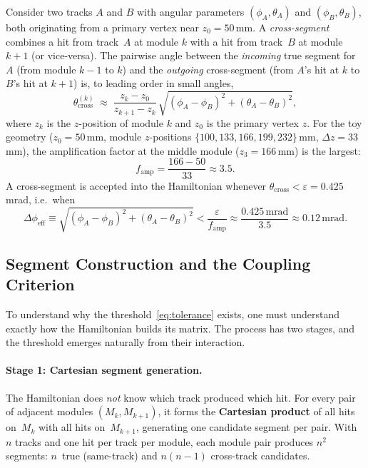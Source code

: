 \documentclass[12pt,a4paper]{article}
\newcommand{\eps}{\varepsilon}
\begin{document}
Consider two tracks $A$ and $B$ with angular parameters
$(\phi_A,\theta_A)$ and $(\phi_B,\theta_B)$, both originating from a
primary vertex near $z_0 = 50$\,mm.
A \emph{cross-segment} combines a hit from track~$A$ at module $k$ with a hit
from track~$B$ at module $k\!+\!1$ (or vice-versa).
The pairwise angle between the \emph{incoming} true segment for~$A$
(from module $k\!-\!1$ to $k$) and the \emph{outgoing} cross-segment
(from $A$'s hit at $k$ to $B$'s hit at $k\!+\!1$) is, to leading order in
small angles,
\begin{equation}
  \theta_\text{cross}^{(k)} \;\approx\;
  \frac{z_k - z_0}{z_{k+1} - z_k}\,
  \sqrt{(\phi_A - \phi_B)^2 + (\theta_A - \theta_B)^2},
  \label{eq:cross_angle}
\end{equation}
where $z_k$ is the $z$-position of module $k$ and $z_0$ is the primary
vertex $z$.
For the toy geometry ($z_0=50$\,mm, module $z$-positions
$\{100, 133, 166, 199, 232\}$\,mm, $\Delta z = 33$\,mm), the amplification
factor at the middle module ($z_3 = 166$\,mm) is the largest:
\begin{equation}
  f_\text{amp} = \frac{166 - 50}{33} \approx 3.5.
  \label{eq:famp}
\end{equation}
A cross-segment is accepted into the Hamiltonian whenever
$\theta_\text{cross} < \eps = 0.425$\,mrad, i.e.\ when
\begin{equation}
  \Delta\phi_\text{eff}
  \equiv \sqrt{(\phi_A-\phi_B)^2 + (\theta_A-\theta_B)^2}
  < \frac{\eps}{f_\text{amp}} \approx \frac{0.425\,\text{mrad}}{3.5}
  \approx 0.12\,\text{mrad}.
  \label{eq:tolerance}
\end{equation}

\subsection{Segment Construction and the Coupling Criterion}
\label{sec:segment_construction}

To understand why the threshold~\eqref{eq:tolerance} exists, one must
understand exactly how the Hamiltonian builds its matrix.  The process has
two stages, and the threshold emerges naturally from their interaction.

\paragraph{Stage 1: Cartesian segment generation.}
The Hamiltonian does \emph{not} know which track produced which hit.
For every pair of adjacent modules $(M_k, M_{k+1})$, it forms the
\textbf{Cartesian product} of all hits on~$M_k$ with all hits
on~$M_{k+1}$, generating one candidate segment per pair.  With $n$ tracks
and one hit per track per module, each module pair produces $n^2$ segments:
$n$~true (same-track) and $n(n-1)$ cross-track candidates.
\end{document}
